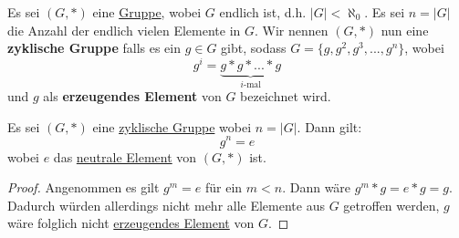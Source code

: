 \documentclass[../../main.tex]{subfiles}
\begin{document}
		\begin{definition}
			\label{def:zyklischeGruppe}
			\label{def:erzeugendesElement}
			Es sei $(G,*)$ eine \hyperref[def:Gruppe]{Gruppe}, wobei $G$ endlich ist, d.h. $|G| < \aleph_0$. Es sei $n=|G|$ die Anzahl der endlich vielen Elemente in $G$. Wir nennen $(G,*)$ nun eine \textbf{zyklische Gruppe} falls es ein $g \in G$ gibt, sodass $G = \{g,g^2,g^3,...,g^n\}$, wobei $$g^i = \underbrace{g * g * ... * g}_{i\textrm{-mal}}$$ und $g$ als \textbf{erzeugendes Element} von $G$ bezeichnet wird.
		\end{definition}
	
		\begin{theorem}
			Es sei $(G,*)$ eine \hyperref[def:zyklischeGruppe]{zyklische Gruppe} wobei $n = |G|$. Dann gilt: $$g^n = e$$ wobei $e$ das \hyperref[def:neutralesElement]{neutrale Element} von $(G,*)$ ist. 
			\begin{proof}
				Angenommen es gilt $g^m = e$ für ein $m < n$. Dann wäre $g^m * g = e * g = g$. Dadurch würden allerdings nicht mehr alle Elemente aus $G$ getroffen werden, $g$ wäre folglich nicht \hyperref[def:erzeugendesElement]{erzeugendes Element} von $G$. 
			\end{proof}
		\end{theorem}
	
	
	
\end{document}
